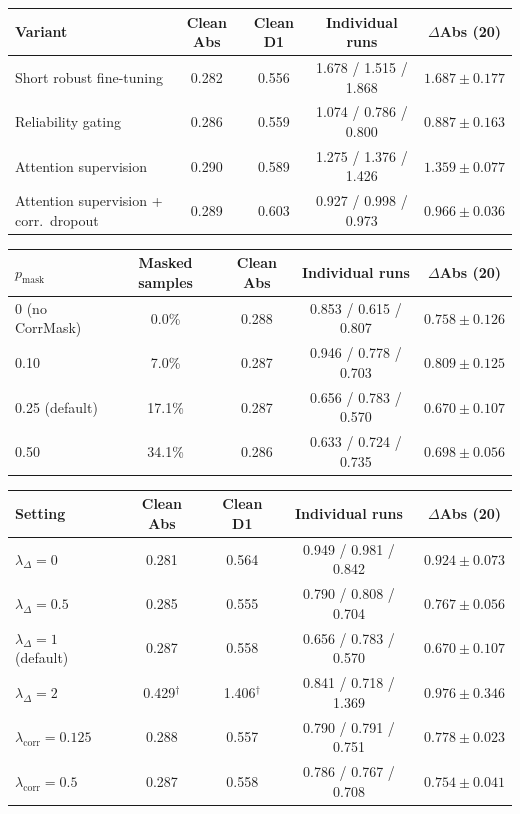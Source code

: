 \begin{tabular}{lcccc}
\toprule
Variant & Clean Abs & Clean D1 & Individual runs & $\Delta$Abs (20) \\
\midrule
Short robust fine-tuning & 0.282 & 0.556 & 1.678 / 1.515 / 1.868 & $1.687\pm0.177$ \\
Reliability gating & 0.286 & 0.559 & 1.074 / 0.786 / 0.800 & $0.887\pm0.163$ \\
Attention supervision & 0.290 & 0.589 & 1.275 / 1.376 / 1.426 & $1.359\pm0.077$ \\
Attention supervision + corr.\ dropout & 0.289 & 0.603 & 0.927 / 0.998 / 0.973 & $0.966\pm0.036$ \\
\bottomrule
\end{tabular}

\begin{tabular}{lcccc}
\toprule
$p_{\mathrm{mask}}$ & Masked samples & Clean Abs & Individual runs & $\Delta$Abs (20) \\
\midrule
0 (no CorrMask) & 0.0\% & 0.288 & 0.853 / 0.615 / 0.807 & $0.758\pm0.126$ \\
0.10 & 7.0\% & 0.287 & 0.946 / 0.778 / 0.703 & $0.809\pm0.125$ \\
0.25 (default) & 17.1\% & 0.287 & 0.656 / 0.783 / 0.570 & $0.670\pm0.107$ \\
0.50 & 34.1\% & 0.286 & 0.633 / 0.724 / 0.735 & $0.698\pm0.056$ \\
\bottomrule
\end{tabular}

\begin{tabular}{lcccc}
\toprule
Setting & Clean Abs & Clean D1 & Individual runs & $\Delta$Abs (20) \\
\midrule
$\lambda_\Delta=0$ & 0.281 & 0.564 & 0.949 / 0.981 / 0.842 & $0.924\pm0.073$ \\
$\lambda_\Delta=0.5$ & 0.285 & 0.555 & 0.790 / 0.808 / 0.704 & $0.767\pm0.056$ \\
$\lambda_\Delta=1$ (default) & 0.287 & 0.558 & 0.656 / 0.783 / 0.570 & $0.670\pm0.107$ \\
$\lambda_\Delta=2$ & 0.429$^{\dagger}$ & 1.406$^{\dagger}$ & 0.841 / 0.718 / 1.369 & $0.976\pm0.346$ \\
$\lambda_{\mathrm{corr}}=0.125$ & 0.288 & 0.557 & 0.790 / 0.791 / 0.751 & $0.778\pm0.023$ \\
$\lambda_{\mathrm{corr}}=0.5$ & 0.287 & 0.558 & 0.786 / 0.767 / 0.708 & $0.754\pm0.041$ \\
\bottomrule
\end{tabular}

